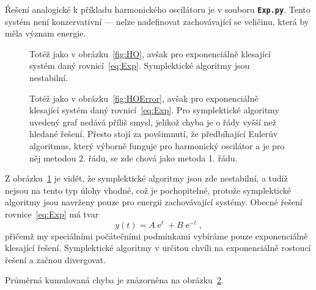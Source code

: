 \documentclass[a4paper,11pt,twoside]{article}
\DeclareMathOperator{\e}{e}
\def\file#1{\textnormal{\textbf{\texttt{#1}}}}
\begin{document}
    \begin{solution}
        Řešení analogické k příkladu harmonického oscilátoru je v souboru \file{Exp.py}.
        Tento systém není konzervativní --- nelze nadefinovat zachovávající se veličinu, která by měla význam energie.

        \begin{figure}[!htbp]\label{fig:Exp}
            \centering
			\caption{
                \protect\small
                Totéž jako v obrázku~\ref{fig:HO}, avšak pro exponenciálně klesající systém daný rovnicí~\eqref{eq:Exp}.
                Symplektické algoritmy jsou nestabilní.
                }	
        \end{figure}
        
        \begin{figure}[!htbp]\label{fig:ExpError}
            \centering
			\caption{
                \protect\small
                Totéž jako v obrázku~\ref{fig:HOError}, avšak pro exponenciálně klesající systém daný rovnicí~\eqref{eq:Exp}.
                Pro symplektické algoritmy uvedený graf nedává příliš smysl, jelikož chyba je o řády vyšší než hledané řešení.
                Přesto stojí za povšimnutí, že předbíhající Eulerův algoritmus, který výborně funguje pro harmonický oscilátor a je pro něj metodou 2. řádu, se zde chová jako metoda 1. řádu.
			}	
        \end{figure}

        Z obrázku~\ref{fig:Exp} je vidět, že symplektické algoritmy jsou zde nestabilní, a tudíž nejsou na tento typ úlohy vhodné, což je pochopitelné, protože symplektické algoritmy jsou navrženy pouze pro energii zachovávající systémy.
        Obecné řešení rovnice~\eqref{eq:Exp} má tvar
        \begin{equation}
            y(t)=A\e^{t}+B\e^{-t},
        \end{equation}
        přičemž my speciálními počátečními podmínkami vybíráme pouze exponenciálně klesající řešení.
        Symplektické algoritmy v určitou chvíli  na exponenciálně rostoucí řešení a začnou divergovat.

        Průměrná kumulovaná chyba je znázorněna na obrázku~\ref{fig:ExpError}. 
    \end{solution}
\end{document}
